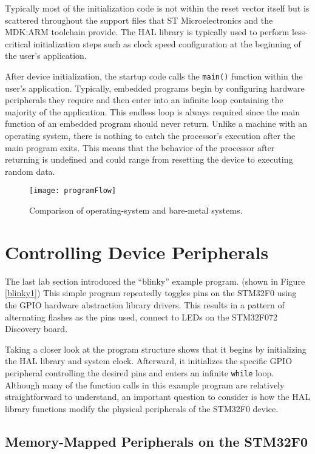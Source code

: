 \documentclass[11pt,fleqn]{book} %
\begin{document}
Typically most of the initialization code is not within the reset vector itself but is scattered throughout the support files that ST Microelectronics and the MDK:ARM toolchain provide. The HAL library is typically used to perform less-critical initialization steps such as clock speed configuration at the beginning of the user's application. 

After device initialization, the startup code calls the \texttt{main()} function within the user's application. Typically, embedded programs begin by configuring hardware peripherals they require and then enter into an infinite loop containing the majority of the application. This endless loop is always required since the main function of an embedded program should never return. Unlike a machine with an operating system, there is nothing to catch the processor's execution after the main program exits. This means that the behavior of the processor after returning is undefined and could range from resetting the device to executing random data.

\begin{figure}[]
    \centering\texttt{[image: programFlow]}
    \caption{Comparison of operating-system and bare-metal systems. }
    \label{programFlow}
\end{figure}


\section{Controlling Device Peripherals}

The last lab section introduced the ``blinky'' example program. (shown in Figure \vref{blinky1}) This simple program repeatedly toggles pins on the STM32F0 using the GPIO hardware abstraction library drivers. This results in a pattern of alternating flashes as the pins used, connect to LEDs on the STM32F072 Discovery board. 

Taking a closer look at the program structure shows that it begins by initializing the HAL library and system clock. Afterward, it initializes the specific GPIO peripheral controlling the desired pins and enters an infinite \texttt{while} loop. Although many of the function calls in this example program are relatively straightforward to understand, an important question to consider is how the HAL library functions modify the physical peripherals of the STM32F0 device.

\subsection{Memory-Mapped Peripherals on the STM32F0}
\end{document}
